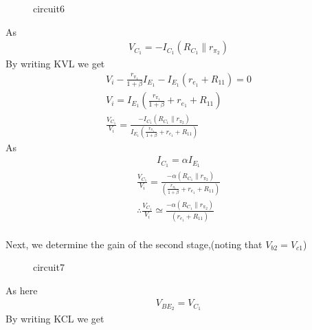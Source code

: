 \begin{enumerate}[label=\thesection.\arabic*.,ref=\thesection.\theenumi]
\begin{figure}[!ht]
\begin{center}
		\resizebox{\columnwidth}{!}{}
	\end{center}
\caption{circuit6}
\label{fig:ee18btech11007_circuit6}
\end{figure}
As
\begin{align}
    V_{C_{1}}=-I_{C_{1}}(R_{C_{1}} \parallel r_{\pi_{2}})
\end{align} 
By writing  KVL we get
\begin{align}
    V_{i} - \frac{r_{\pi_{1}}}{1+\beta} I_{E_{1}} - I_{E_{1}}(r_{e_{1}} + R_{11}) =0 \\
    V_{i} = I_{E_{1}}(\frac{r_{\pi_{1}}}{1+\beta} + r_{e_{1}} + R_{11} ) \\ 
    \frac{V_{C_{1}}}{V_{i}} = \frac{-I_{C_{1}}(R_{C_{1}} \parallel r_{\pi_{2}})}{ I_{E_{1}}(\frac{r_{\pi_{1}}}{1+\beta} + r_{e_{1}} + R_{11} )}
\end{align}
As \begin{align}
    I_{C_{1}}=\alpha  I_{E_{1}}
\end{align} 
%
\begin{align}
    \frac{V_{C_{1}}}{V_{i}} = \frac{- \alpha(R_{C_{1}} \parallel r_{\pi_{2}})}{(\frac{r_{\pi_{1}}}{1+\beta} + r_{e_{1}} + R_{11} )}\\
    \therefore \frac{V_{C_{1}}}{V_{i}} \simeq \frac{- \alpha(R_{C_{1}} \parallel r_{\pi_{2}})}{ (r_{e_{1}} + R_{11} )} \\
\end{align}


%
Next, we determine the gain of the second stage,(noting that $V_{b2}=V_{c1}$)
\begin{figure}[!ht]
	\begin{center}
		
		\resizebox{\columnwidth}{!}{}
	\end{center}
\caption{circuit7}
\label{fig:ee18btech11007_circuit7}
\end{figure}

As here 
\begin{align}
    V_{BE_{2}}=V_{C_{1}}
\end{align}
By writing KCL we  get


\end{enumerate}
